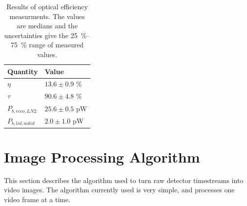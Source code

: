 \begin{table}[t]
\centering
\caption{
Results of optical efficiency measurments.
The values are medians and the uncertainties give the \SIrange{25}{75}{\percent} range of measured values.
}
\label{tab:opt-eff}
\begin{tabular}{l l}
\toprule
Quantity &  Value \\
\midrule
$\eta$ & $13.6 \pm  0.9$ \% \\ 
$\tau$ & $90.6 \pm  4.8$ \% \\ 
$P_{b,ecco,LN2}$   & $25.6 \pm  0.5$ pW \\ 
$P_{b,lid,no lid}$ & $ 2.0 \pm  1.0$ pW \\
\bottomrule
\end{tabular}
\end{table}
 
\section{Image Processing Algorithm} \label{sec:ch8-algo}

This section describes the algorithm used to turn raw detector timestreams into video images.
The algorithm currently used is very simple, and processes one video frame at a time.

